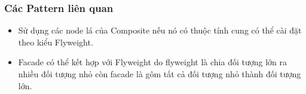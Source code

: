 \subsubsection{Các Pattern liên quan}
\begin{itemize}
    \item Sử dụng các node lá của Composite nếu nó có thuộc tính cung có thể cài đặt theo kiểu Flyweight.
    \item Facade có thể kết hợp với Flyweight do flyweight là chia đối tượng lớn ra nhiều đối tượng nhỏ còn facade là gôm tất cả đối tượng nhỏ thành đối tượng lớn.
\end{itemize}